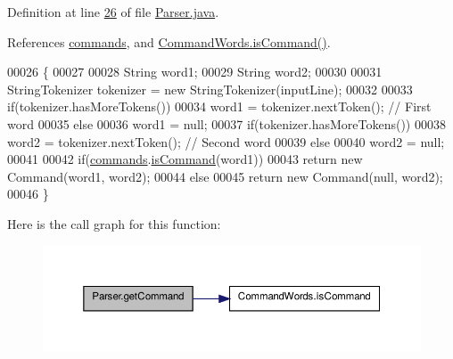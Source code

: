 Definition at line \hyperlink{Parser_8java_source_l00026}{26} of file \hyperlink{Parser_8java_source}{Parser.\-java}.



References \hyperlink{Parser_8java_source_l00014}{commands}, and \hyperlink{CommandWords_8java_source_l00028}{Command\-Words.\-is\-Command()}.


\begin{DoxyCode}
00026                                                 \{
00027 
00028         String word1;
00029         String word2;
00030 
00031         StringTokenizer tokenizer = \textcolor{keyword}{new} StringTokenizer(inputLine);
00032 
00033         \textcolor{keywordflow}{if}(tokenizer.hasMoreTokens())
00034             word1 = tokenizer.nextToken();  \textcolor{comment}{// First word}
00035         \textcolor{keywordflow}{else}
00036             word1 = null;
00037         \textcolor{keywordflow}{if}(tokenizer.hasMoreTokens())
00038             word2 = tokenizer.nextToken();  \textcolor{comment}{// Second word}
00039         \textcolor{keywordflow}{else}
00040             word2 = null;
00041 
00042         \textcolor{keywordflow}{if}(\hyperlink{classParser_a6afb99e1595e6bc0705a09ee00dbddd6}{commands}.\hyperlink{classCommandWords_a98619d278b3fa23fed18b5834f9d20a8}{isCommand}(word1))
00043             \textcolor{keywordflow}{return} \textcolor{keyword}{new} Command(word1, word2);
00044         \textcolor{keywordflow}{else}
00045             \textcolor{keywordflow}{return} \textcolor{keyword}{new} Command(null, word2);
00046     \}
\end{DoxyCode}


Here is the call graph for this function\-:\nopagebreak
\begin{figure}[H]
\begin{center}
\leavevmode
\includegraphics[width=350pt]{classParser_a5ee0a1ad3df67b8814d34c81e7276371_cgraph}
\end{center}
\end{figure}


